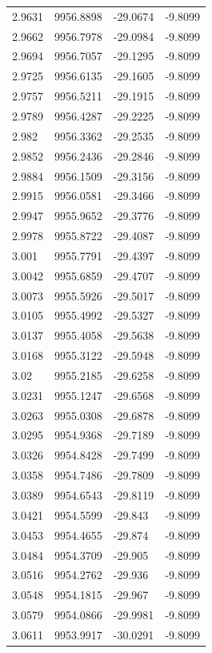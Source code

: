 \begin{table}[H]
\begin{tabular}{llll}
2.9631 & 9956.8898 & -29.0674 & -9.8099 \\
2.9662 & 9956.7978 & -29.0984 & -9.8099 \\
2.9694 & 9956.7057 & -29.1295 & -9.8099 \\
2.9725 & 9956.6135 & -29.1605 & -9.8099 \\
2.9757 & 9956.5211 & -29.1915 & -9.8099 \\
2.9789 & 9956.4287 & -29.2225 & -9.8099 \\
2.982 & 9956.3362 & -29.2535 & -9.8099 \\
2.9852 & 9956.2436 & -29.2846 & -9.8099 \\
2.9884 & 9956.1509 & -29.3156 & -9.8099 \\
2.9915 & 9956.0581 & -29.3466 & -9.8099 \\
2.9947 & 9955.9652 & -29.3776 & -9.8099 \\
2.9978 & 9955.8722 & -29.4087 & -9.8099 \\
3.001 & 9955.7791 & -29.4397 & -9.8099 \\
3.0042 & 9955.6859 & -29.4707 & -9.8099 \\
3.0073 & 9955.5926 & -29.5017 & -9.8099 \\
3.0105 & 9955.4992 & -29.5327 & -9.8099 \\
3.0137 & 9955.4058 & -29.5638 & -9.8099 \\
3.0168 & 9955.3122 & -29.5948 & -9.8099 \\
3.02 & 9955.2185 & -29.6258 & -9.8099 \\
3.0231 & 9955.1247 & -29.6568 & -9.8099 \\
3.0263 & 9955.0308 & -29.6878 & -9.8099 \\
3.0295 & 9954.9368 & -29.7189 & -9.8099 \\
3.0326 & 9954.8428 & -29.7499 & -9.8099 \\
3.0358 & 9954.7486 & -29.7809 & -9.8099 \\
3.0389 & 9954.6543 & -29.8119 & -9.8099 \\
3.0421 & 9954.5599 & -29.843 & -9.8099 \\
3.0453 & 9954.4655 & -29.874 & -9.8099 \\
3.0484 & 9954.3709 & -29.905 & -9.8099 \\
3.0516 & 9954.2762 & -29.936 & -9.8099 \\
3.0548 & 9954.1815 & -29.967 & -9.8099 \\
3.0579 & 9954.0866 & -29.9981 & -9.8099 \\
3.0611 & 9953.9917 & -30.0291 & -9.8099 \\

\end{tabular}
\end{table}
